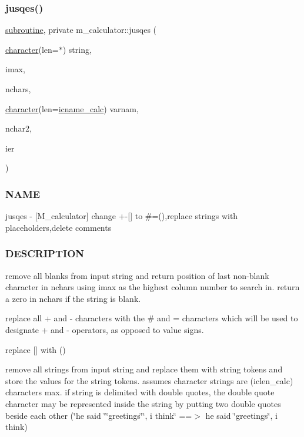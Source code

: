 \subsubsection{\texorpdfstring{jusqes()}{jusqes()}}
{\footnotesize\ttfamily \hyperlink{M__stopwatch_83_8txt_acfbcff50169d691ff02d4a123ed70482}{subroutine}, private m\+\_\+calculator\+::jusqes (\begin{DoxyParamCaption}\item[{\hyperlink{option__stopwatch_83_8txt_abd4b21fbbd175834027b5224bfe97e66}{character}(len=$\ast$)}]{string,  }\item[{}]{imax,  }\item[{}]{nchars,  }\item[{\hyperlink{option__stopwatch_83_8txt_abd4b21fbbd175834027b5224bfe97e66}{character}(len=\hyperlink{namespacem__calculator_a482f8880712dc8f52ef6833de3243875}{icname\+\_\+calc})}]{varnam,  }\item[{}]{nchar2,  }\item[{}]{ier }\end{DoxyParamCaption})\hspace{0.3cm}{\ttfamily [private]}}



\subsubsection*{N\+A\+ME}

jusqes -\/ \mbox{[}M\+\_\+calculator\mbox{]} change +-\/\mbox{[}\mbox{]} to \#=(),replace strings with placeholders,delete comments 

\subsubsection*{D\+E\+S\+C\+R\+I\+P\+T\+I\+ON}

remove all blanks from input string and return position of last non-\/blank character in nchars using imax as the highest column number to search in. return a zero in nchars if the string is blank.

replace all + and -\/ characters with the \# and = characters which will be used to designate + and -\/ operators, as opposed to value signs.

replace \mbox{[}\mbox{]} with ()

remove all strings from input string and replace them with string tokens and store the values for the string tokens. assumes character strings are (iclen\+\_\+calc) characters max. if string is delimited with double quotes, the double quote character may be represented inside the string by putting two double quotes beside each other (\char`\"{}he said \char`\"{}\char`\"{}greetings\char`\"{}\char`\"{}, i think\char`\"{} ==$>$ he said \char`\"{}greetings\char`\"{}, i think)

